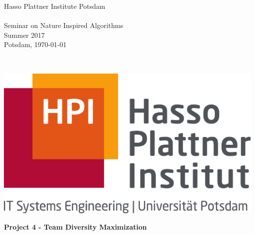 \documentclass[12pt,a4paper]{article}
\begin{document}
\noindent
\begin{minipage}{0.66\textwidth}
Hasso Plattner Institute Potsdam\\
\\
Seminar on Nature Inspired Algorithms\\ Summer 2017\\
Potsdam, \today
\end{minipage}
~
\begin{minipage}{0.30\textwidth}
\includegraphics[width=\textwidth]{Hasso_Plattner_Institut_Logo} 
\end{minipage}


\begin{center}
 {\LARGE \textbf{Project 4 - Team Diversity Maximization}\\}
 \vspace*{0.5cm}
\end{center}
\end{document}
